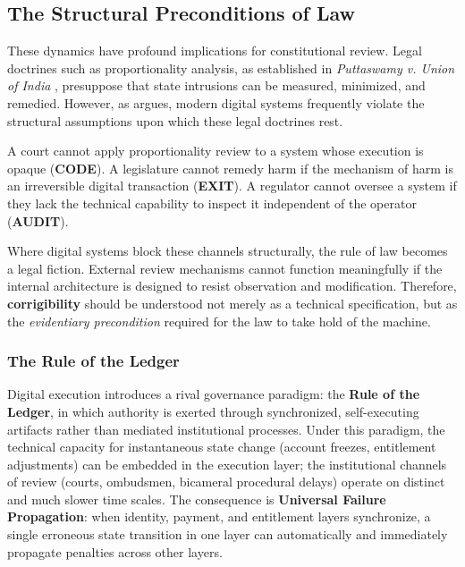 \subsection{The Structural Preconditions of Law}
\label{subsec:rule-of-ledger}

These dynamics have profound implications for constitutional review. Legal doctrines such as proportionality analysis, as established in \textit{Puttaswamy v. Union of India} \citep{puttaswamy2017}, presuppose that state intrusions can be measured, minimized, and remedied. However, as \citet{bhatia2019} argues, modern digital systems frequently violate the structural assumptions upon which these legal doctrines rest.

A court cannot apply proportionality review to a system whose execution is opaque (\textbf{CODE}). A legislature cannot remedy harm if the mechanism of harm is an irreversible digital transaction (\textbf{EXIT}). A regulator cannot oversee a system if they lack the technical capability to inspect it independent of the operator (\textbf{AUDIT}).

Where digital systems block these channels structurally, the rule of law becomes a legal fiction. External review mechanisms cannot function meaningfully if the internal architecture is designed to resist observation and modification. Therefore, \textbf{corrigibility} should be understood not merely as a technical specification, but as the \textit{evidentiary precondition} required for the law to take hold of the machine.

\subsubsection{The Rule of the Ledger}

Digital execution introduces a rival governance paradigm: the \textbf{Rule of the Ledger}, in which authority is exerted through synchronized, self-executing artifacts rather than mediated institutional processes. Under this paradigm, the technical capacity for instantaneous state change (account freezes, entitlement adjustments) can be embedded in the execution layer; the institutional channels of review (courts, ombudsmen, bicameral procedural delays) operate on distinct and much slower time scales. The consequence is \textbf{Universal Failure Propagation}: when identity, payment, and entitlement layers synchronize, a single erroneous state transition in one layer can automatically and immediately propagate penalties across other layers.


